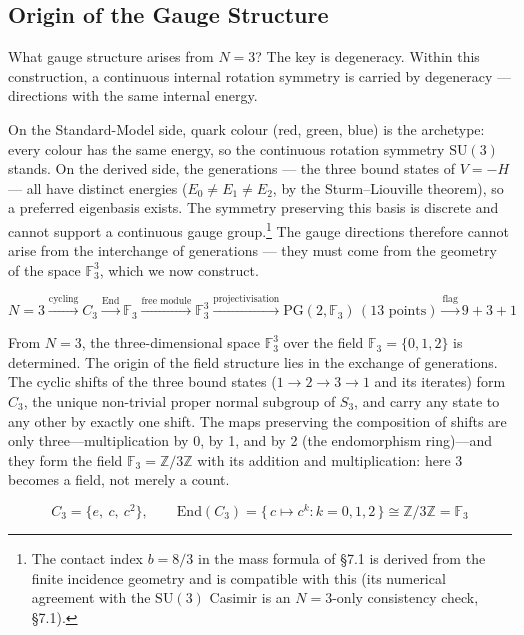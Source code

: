 \documentclass[12pt,a4paper]{article}
\begin{document}
\subsection{Origin of the Gauge Structure}\label{sec:gauge-origin}

What gauge structure arises from $N = 3$?
The key is degeneracy. Within this construction, a continuous internal rotation symmetry is
carried by degeneracy --- directions with the same internal energy.

On the Standard-Model side, quark colour (red, green, blue) is the
archetype: every colour has the same energy, so the continuous
rotation symmetry $\mathrm{SU}(3)$ stands.
On the derived side, the generations --- the three bound states of
$V = -H$ --- all have distinct energies
($E_0 \neq E_1 \neq E_2$, by the Sturm--Liouville theorem),
so a preferred eigenbasis exists.
The symmetry preserving this basis is discrete and cannot support a
continuous gauge group.\footnote{The contact index $b = 8/3$ in the mass formula of \S7.1 is derived from the finite incidence geometry and is compatible with this (its numerical agreement with the $\mathrm{SU}(3)$ Casimir is an $N = 3$-only consistency check, \S7.1).}
The gauge directions therefore cannot arise from the interchange of
generations --- they must come from the geometry of the space
$\mathbb{F}_3^3$, which we now construct.

\[N = 3 \xrightarrow{\text{cycling}} C_3 \xrightarrow{\mathrm{End}} \mathbb{F}_3 \xrightarrow{\text{free module}} \mathbb{F}_3^3 \xrightarrow{\text{projectivisation}} \mathrm{PG}(2,\mathbb{F}_3)\,(13\text{ points}) \xrightarrow{\text{flag}} 9{+}3{+}1\]

From $N = 3$, the three-dimensional space
$\mathbb{F}_3^3$ over the field $\mathbb{F}_3 = \{0,1,2\}$
is determined.
The origin of the field structure lies in the exchange of generations. The cyclic shifts of the three bound states ($1 \to 2 \to 3 \to 1$ and its iterates) form $C_3$, the unique non-trivial proper normal subgroup of $S_3$, and carry any state to any other by exactly one shift. The maps preserving the composition of shifts are only three---multiplication by 0, by 1, and by 2 (the endomorphism ring)---and they form the field $\mathbb{F}_3 = \mathbb{Z}/3\mathbb{Z}$ with its addition and multiplication: here 3 becomes a field, not merely a count.

\[C_3 = \{e,\ c,\ c^2\},\qquad \mathrm{End}(C_3) = \{\,c \mapsto c^k : k = 0, 1, 2\,\} \cong \mathbb{Z}/3\mathbb{Z} = \mathbb{F}_3\]
\end{document}
